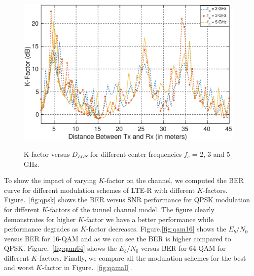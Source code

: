 \begin{figure}[!ht]
\centering
\includegraphics[width=\textwidth,keepaspectratio,height=8cm]{images/Gill/lte_figs/kfactordist.eps} 
\caption{K-factor versus $D_{LOS}$ for different center frequencies $f_c$ = 2, 3 and 5 GHz.}
\label{kfactor}
\end{figure}

To show the impact of varying $K$-factor on the channel, we computed the BER curve for different modulation schemes of LTE-R with different $K$-factors. Figure.~\ref{fig:qpsk} shows the BER versus SNR performance for QPSK modulation for different $K$-factors of the tunnel channel model. The figure clearly demonstrates for higher $K$-factor we have a better performance while performance degrades as $K$-factor decreases. Figure.\ref{fig:qam16} shows the $E_b/N_0$ versus BER for 16-QAM and as we can see the BER is higher compared to QPSK. Figure.~\ref{fig:qam64} shows the $E_b/N_0$ versus BER for 64-QAM for different $K$-factors. Finally, we compare all the modulation schemes for the best and worst $K$-factor in Figure.~\ref{fig:qamall}.

